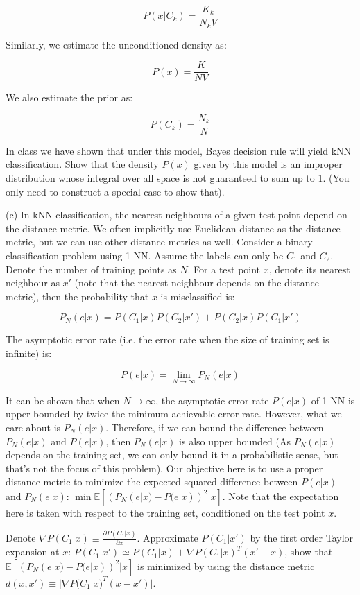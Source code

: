 $$
P(x | C_k) = \frac{K_k}{N_k V}
$$

Similarly, we estimate the unconditioned density as:

$$
P(x) = \frac{K}{N V}
$$

We also estimate the prior as:

$$
P(C_k) = \frac{N_k}{N}
$$

In class we have shown that under this model, Bayes decision rule will yield kNN classification. Show that the density $P(x)$ given by this model is an improper distribution whose integral over all space is not guaranteed to sum up to 1. (You only need to construct a special case to show that).

(c) In kNN classification, the nearest neighbours of a given test point depend on the distance metric. We often implicitly use Euclidean distance as the distance metric, but we can use other distance metrics as well. Consider a binary classification problem using 1-NN. Assume the labels can only be $C_1$ and $C_2$. Denote the number of training points as $N$. For a test point $x$, denote its nearest neighbour as $x'$ (note that the nearest neighbour depends on the distance metric), then the probability that $x$ is misclassified is:

$$
P_N(e|x) = P(C_1 | x) P(C_2 | x') + P(C_2 | x) P(C_1 | x')
$$

The asymptotic error rate (i.e. the error rate when the size of training set is infinite) is:

$$
P(e|x) = \lim_{N \to \infty} P_N (e|x)
$$

It can be shown that when $N\to \infty$, the asymptotic error rate $P(e|x)$ of 1-NN is upper bounded by twice the minimum achievable error rate. However, what we care about is $P_N(e|x)$. Therefore, if we can bound the difference between $P_N(e|x)$ and $P(e|x)$, then $P_N(e|x)$ is also upper bounded (As $P_N(e|x)$ depends on the training set, we can only bound it in a probabilistic sense, but that's not the focus of this problem). Our objective here is to use a proper distance metric to minimize the expected squared difference between $P(e|x)$ and $P_N(e|x)$: $\min \mathbb{E} [(P_N(e|x) - P(e|x))^2 | x]$. Note that the expectation here is taken with respect to the training set, conditioned on the test point $x$.

Denote $\nabla P(C_1 |x) \equiv \frac{\partial P(C_1|x)}{\partial x}$. Approximate $P(C_1 |x')$ by the first order Taylor expansion at $x$: $P(C_1 |x') \simeq  P(C_1 | x) + \nabla P(C_1 |x)^T (x'-x)$, show that $\mathbb{E} [(P_N(e|x) - P(e|x))^2 | x]$ is minimized by using the distance metric $d(x, x') \equiv |\nabla P(C_1 |x)^T (x - x')|$.

